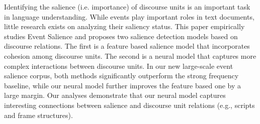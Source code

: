 Identifying the salience (i.e. importance) of discourse units is an important task in language understanding. While events play important roles in text documents, little research exists on analyzing their saliency status. This paper empirically studies Event Salience and proposes two salience detection models based on discourse relations. The first is a feature based salience model that incorporates cohesion among discourse units. The second is a neural model that captures more complex interactions between discourse units. In our new large-scale event salience corpus, both methods significantly outperform the strong frequency baseline, while our neural model further improves the feature based one by a large margin. Our analyses demonstrate that our neural model captures interesting connections between salience and discourse unit relations (e.g., scripts and frame structures).
